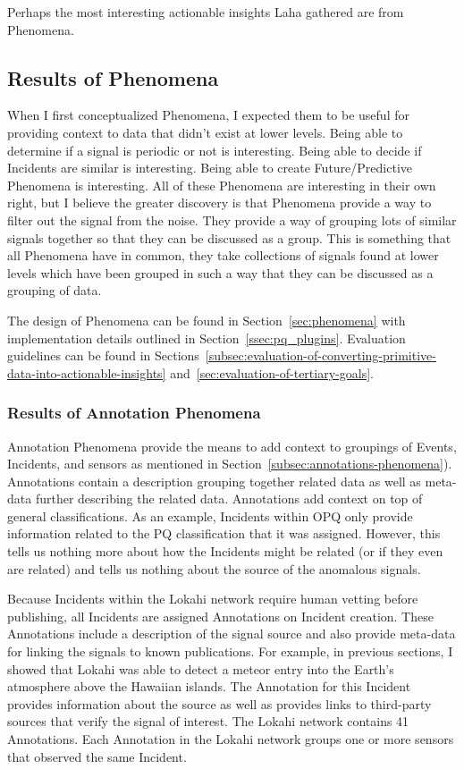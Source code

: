 Perhaps the most interesting actionable insights Laha gathered are from Phenomena.

\subsection{Results of Phenomena}\label{subsec:results-of-phenomena}

When I first conceptualized Phenomena, I expected them to be useful for providing context to data that didn't exist at lower levels. Being able to determine if a signal is periodic or not is interesting. Being able to decide if Incidents are similar is interesting. Being able to create Future/Predictive Phenomena is interesting. All of these Phenomena are interesting in their own right, but I believe the greater discovery is that Phenomena provide a way to filter out the signal from the noise. They provide a way of grouping lots of similar signals together so that they can be discussed as a group. This is something that all Phenomena have in common, they take collections of signals found at lower levels which have been grouped in such a way that they can be discussed as a grouping of data.

The design of Phenomena can be found in Section~\ref{sec:phenomena} with implementation details outlined in Section~\ref{ssec:pq_plugins}. Evaluation guidelines can be found in Sections~\ref{subsec:evaluation-of-converting-primitive-data-into-actionable-insights} and~\ref{sec:evaluation-of-tertiary-goals}.

\subsubsection{Results of Annotation Phenomena}

Annotation Phenomena provide the means to add context to groupings of Events, Incidents, and sensors as mentioned in Section~\ref{subsec:annotations-phenomena}). Annotations contain a description grouping together related data as well as meta-data further describing the related data. Annotations add context on top of general classifications. As an example, Incidents within OPQ only provide information related to the PQ classification that it was assigned. However, this tells us nothing more about how the Incidents might be related (or if they even are related) and tells us nothing about the source of the anomalous signals.

Because Incidents within the Lokahi network require human vetting before publishing, all Incidents are assigned Annotations on Incident creation. These Annotations include a description of the signal source and also provide meta-data for linking the signals to known publications. For example, in previous sections, I showed that Lokahi was able to detect a meteor entry into the Earth's atmosphere above the Hawaiian islands. The Annotation for this Incident provides information about the source as well as provides links to third-party sources that verify the signal of interest. The Lokahi network contains 41 Annotations. Each Annotation in the Lokahi network groups one or more sensors that observed the same Incident.

